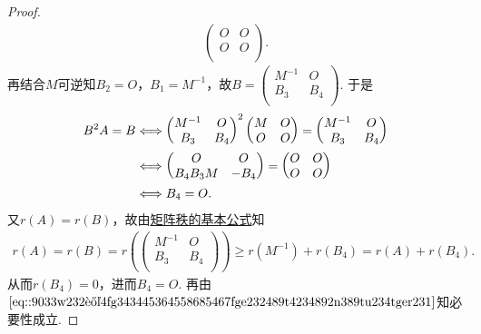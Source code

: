 \documentclass[../../main.tex]{subfiles}
\begin{document}
\begin{proof}
\begin{align*}
\begin{pmatrix}
O&		O\\
O&		O\\
\end{pmatrix}.
\end{align*}
再结合\(M\)可逆知\(B_2 = O\)，\(B_1 = M^{-1}\)，故\(B = \begin{pmatrix}
M^{-1}&		O\\
B_3&		B_4\\
\end{pmatrix}\). 于是
\begin{align}
B^2A = B &\Longleftrightarrow \begin{pmatrix}
M^{-1}&		O\\
B_3&		B_4\\
\end{pmatrix}^2 \begin{pmatrix}
M&		O\\
O&		O\\
\end{pmatrix} = \begin{pmatrix}
M^{-1}&		O\\
B_3&		B_4\\
\end{pmatrix} \notag \\
&\Longleftrightarrow \begin{pmatrix}
O&		O\\
B_4B_3M&		-B_4\\
\end{pmatrix} = \begin{pmatrix}
O&		O\\
O&		O\\
\end{pmatrix} \notag \\
&\Longleftrightarrow B_4 = O. \label{eq::9033w232让4fg343445364558685467fge232489t4234892n389tu234tger231}
\end{align}
又\(r(A) = r(B)\)，故由\hyperref[proposition:矩阵秩的基本公式]{矩阵秩的基本公式}知
\begin{align*}
r(A) = r(B) = r\left( \begin{pmatrix}
M^{-1}&		O\\
B_3&		B_4\\
\end{pmatrix} \right) \geqslant r(M^{-1}) + r(B_4) = r(A) + r(B_4).
\end{align*}
从而\(r(B_4) = 0\)，进而\(B_4 = O\). 再由\(\eqref{eq::9033w232让4fg343445364558685467fge232489t4234892n389tu234tger231}\)知必要性成立.


\end{proof}
\end{document}

